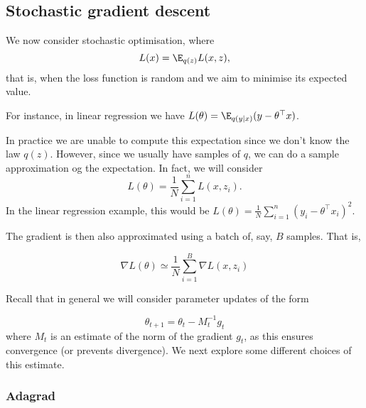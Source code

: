 \subsection{Stochastic gradient descent}
\label{sub:SGD}


We now consider stochastic optimisation, where
\begin{equation}
	L(x) = \E_{q(z)}L(x,z),
\end{equation}
that is, when the loss function is random and we aim to minimise its expected value. 

For instance, in linear regression we have $L(\theta)=\E_{q(y|x)}(y-\theta^\top x)$.

In practice we are unable to compute this expectation since we don't know the law $q(z)$. However, since we usually have samples of $q$, we can do a sample approximation og the expectation. In fact, we will consider
\begin{equation}
	L(\theta) = \frac{1}{N}\sum_{i=1}^nL(x,z_i).
\end{equation}
In the linear regression example, this would be $L(\theta) = \frac{1}{N}\sum_{i=1}^n(y_i-\theta^\top x_i)^2.$ 

The gradient is then also approximated using a batch of, say, $B$ samples. That is, 

\begin{equation}
	\nabla L(\theta)\simeq \frac{1}{N}\sum_{i=1}^B\nabla L(x,z_i)
\end{equation}

\begin{mdframed}[style=ejemplo, frametitle={\center Example: random loss function for linear regression}]


\end{mdframed}

Recall that in general we will consider parameter updates of the form 

\begin{equation}
	\theta_{t+1} = \theta_t -M_t^{-1} g_t
\end{equation}
where $M_t$ is an estimate of the norm of the gradient $g_t$, as this ensures convergence (or prevents divergence). We next explore some different choices of this estimate.

\subsubsection{Adagrad}

